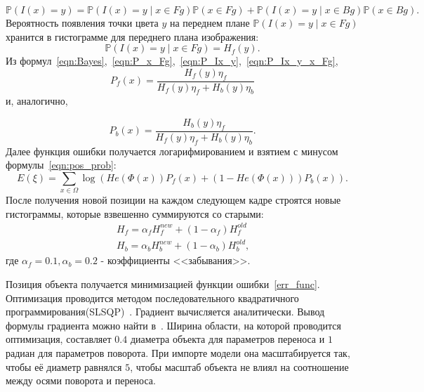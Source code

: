 \begin{equation} \label{eqn:P_Ix_y} \mathbb{P}(I(x) = y) = \mathbb{P}(I(x) = y
\mid x \in Fg) \mathbb{P}(x \in Fg) + \mathbb{P}(I(x) = y \mid x \in Bg)
\mathbb{P}(x \in Bg) \text{.} \end{equation}
Вероятность появления точки цвета $y$ на переднем плане $\mathbb{P}(I(x) = y
\mid x \in Fg)$ хранится в гистограмме для переднего плана изображения:
\begin{equation} \label{eqn:P_Ix_y_x_Fg} \mathbb{P}(I(x) = y \mid x \in Fg) =
H_f(y) \text{.} \end{equation}
Из
формул~\ref{eqn:Bayes},~\ref{eqn:P_x_Fg},~\ref{eqn:P_Ix_y},~\ref{eqn:P_Ix_y_x_Fg},
\begin{equation} \label{eqn:P_x_Fg_y} P_f(x)= \frac{H_f(y)\eta_f}{H_f(y)\eta_f
+ H_b(y)\eta_b} \end{equation}
и, аналогично,

\begin{equation} \label{eqn:P_x_Bg_y} P_b(x) = \frac{H_b(y)\eta_f}{H_f(y)\eta_f
+ H_b(y)\eta_b} \text{.} \end{equation}
Далее функция ошибки получается логарифмированием и взятием с минусом
формулы~\ref{eqn:pos_prob}:
\begin{equation} \label{err_func} E(\xi) = \sum\limits_{x \in \Omega}
\log(He(\Phi(x))P_f(x) + (1 - He(\Phi(x)))P_b(x)) \text{.} \end{equation}
После получения новой позиции на каждом следующем кадре строятся новые
гистограммы, которые взвешенно суммируются со старыми:
\begin{equation} \begin{array}{c} H_{f} = \alpha_f H_{f}^{new} + (1 - \alpha_f)
H_f^{old} \\ H_{b} = \alpha_b H_{b}^{new} + (1 - \alpha_b) H_b^{old} \text{,}
\end{array} \end{equation}
где $\alpha_f = 0.1, \alpha_b = 0.2$ - коэффициенты <<забывания>>.

Позиция объекта получается минимизацией функции ошибки~\ref{err_func}.
Оптимизация проводится методом последовательного квадратичного
программирования(SLSQP)~\cite{SLSQP}. Градиент вычисляется аналитически. Вывод
формулы градиента можно найти в~\cite{Tjaden2018}. Ширина области, на которой
проводится оптимизация, составляет $0.4$ диаметра объекта для параметров
переноса и $1$ радиан для параметров поворота. При импорте модели она
масштабируется так, чтобы её диаметр равнялся $5$, чтобы масштаб объекта не
влиял на соотношение между осями поворота и переноса.
